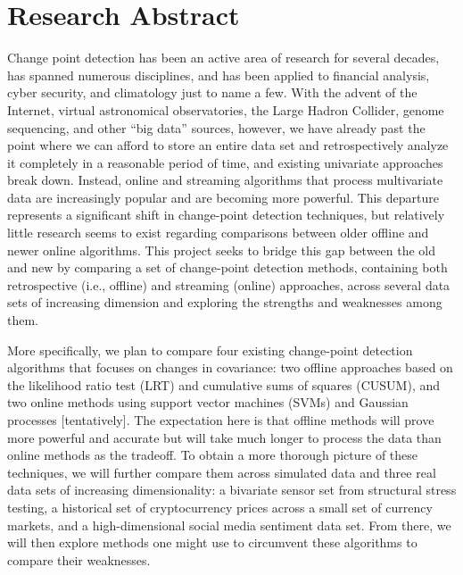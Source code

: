 \documentclass[10pt,letterpaper]{article}
\begin{document}
\maketitle

\section{Research Abstract}

Change point detection has been an active area of research for several decades, has spanned numerous disciplines, and has been applied to financial analysis, cyber security, and climatology just to name a few.
With the advent of the Internet, virtual astronomical observatories, the Large Hadron Collider, genome sequencing, and other ``big data'' sources, however, we have already past the point where we can afford to store an entire data set and retrospectively analyze it completely in a reasonable period of time, and existing univariate approaches break down.
Instead, online and streaming algorithms that process multivariate data are increasingly popular and are becoming more powerful.
This departure represents a significant shift in change-point detection techniques, but relatively little research seems to exist regarding comparisons between older offline and newer online algorithms.
This project seeks to bridge this gap between the old and new by comparing a set of change-point detection methods, containing both retrospective (i.e., offline) and streaming (online) approaches, across several data sets of increasing dimension and exploring the strengths and weaknesses among them.

More specifically, we plan to compare four existing change-point detection algorithms that focuses on changes in covariance: two offline approaches based on the likelihood ratio test (LRT) and cumulative sums of squares (CUSUM), and two online methods using support vector machines (SVMs) and Gaussian processes [tentatively].
The expectation here is that offline methods will prove more powerful and accurate but will take much longer to process the data than online methods as the tradeoff.
To obtain a more thorough picture of these techniques, we will further compare them across simulated data and three real data sets of increasing dimensionality: a bivariate sensor set from structural stress testing, a historical set of cryptocurrency prices across a small set of currency markets, and a high-dimensional social media sentiment data set.
From there, we will then explore methods one might use to circumvent these algorithms to compare their weaknesses.
\end{document}
